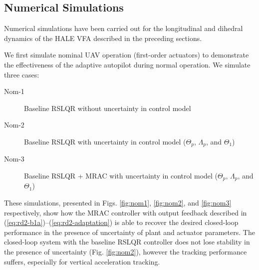 \documentclass[english]{ifacconf}
\begin{document}

\subsection{Numerical Simulations}
Numerical simulations have been carried out for the longitudinal and dihedral dynamics of the HALE VFA described in the preceding sections. 

We first simulate nominal UAV operation (first-order actuators) to demonstrate the effectiveness of the adaptive autopilot during normal operation. We simulate three cases:
\begin{description}
	\item[Nom-1] Baseline RSLQR without uncertainty in control model
	\item[Nom-2] Baseline RSLQR with uncertainty in control model ($\Theta_p$, $\Lambda_p$, and $\Theta_1$)
	\item[Nom-3] Baseline RSLQR + MRAC with uncertainty in control model ($\Theta_p$, $\Lambda_p$, and $\Theta_1$)
\end{description}

These simulations, presented in Figs. \ref{fig:nom1}, \ref{fig:nom2}, and \ref{fig:nom3} respectively, show how the MRAC controller with output feedback described in (\ref{eq:rd2-b1a})--(\ref{eq:rd2-adaptation}) is able to recover the desired closed-loop performance in the presence of uncertainty of plant and actuator parameters. The closed-loop system with the baseline RSLQR controller does not lose stability in the presence of uncertainty (Fig. \ref{fig:nom2}), however the tracking performance suffers, especially for vertical acceleration tracking.
\end{document}
